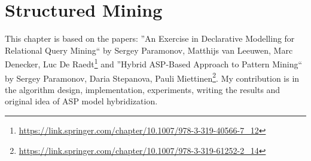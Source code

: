 \chapter{Structured Mining}\label{ch:StructuredMining}
This chapter is based on the papers: ''An Exercise in Declarative Modelling for Relational Query Mining`` by Sergey Paramonov, Matthijs van Leeuwen, Marc Denecker, Luc De Raedt\footnote{\url{https://link.springer.com/chapter/10.1007/978-3-319-40566-7_12}} and ''Hybrid ASP-Based Approach to Pattern Mining`` by Sergey Paramonov, Daria Stepanova, Pauli Miettinen\footnote{\url{https://link.springer.com/chapter/10.1007/978-3-319-61252-2_14}}. My contribution is in the algorithm design, implementation, experiments, writing the results and original idea of ASP model hybridization.

\newcommand{\revision}[1]{#1\xspace}
%
%













\cleardoublepage
